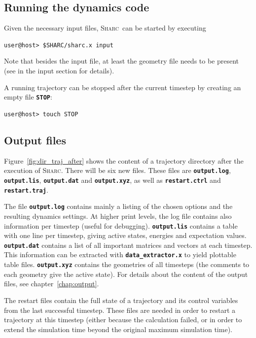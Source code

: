 \documentclass[a4paper,11pt,DIV=15,openany,twoside=false]{scrbook}
\newcommand{\sharc}{\textsc{Sharc}}
\newcommand{\ttt}[1]{\textbf{\texttt{#1}}}
\newenvironment{example}{
  \vspace{0mm}
  \definecolor{shadecolor}{HTML}{E4F4FF}
  \begin{shaded}
}{
  \end{shaded}
}
\begin{document}
\subsection{Running the dynamics code}

Given the necessary input files, \sharc\ can be started by executing
\begin{example}
\verb|user@host> $SHARC/sharc.x input|
\end{example}
Note that besides the input file, at least the geometry file needs to be present (see in the input section for details).

A running trajectory can be stopped after the current timestep by creating an empty file \ttt{STOP}:
\begin{example}
\verb|user@host> touch STOP|
\end{example}

\subsection{Output files}

Figure~\ref{fig:dir_traj_after} shows the content of a trajectory directory after the execution of \sharc. There will be six new files. These files are \ttt{output.log}, \ttt{output.lis}, \ttt{output.dat} and \ttt{output.xyz}, as well as \ttt{restart.ctrl} and \ttt{restart.traj}.

The file \ttt{output.log} contains mainly a listing of the chosen options and the resulting dynamics settings. At higher print levels, the log file contains also information per timestep (useful for debugging). \ttt{output.lis} contains a table with one line per timestep, giving active states, energies and expectation values. \ttt{output.dat} contains a list of all important matrices and vectors at each timestep. This information can be extracted with \ttt{data\_extractor.x} to yield plottable table files. \ttt{output.xyz} contains the geometries of all timesteps (the comments to each geometry give the active state).
For details about the content of the output files, see chapter~\ref{chap:output}.

The restart files contain the full state of a trajectory and its control variables from the last successful timestep. These files are needed in order to restart a trajectory at this timestep (either because the calculation failed, or in order to extend the simulation time beyond the original maximum simulation time). 
\end{document}
